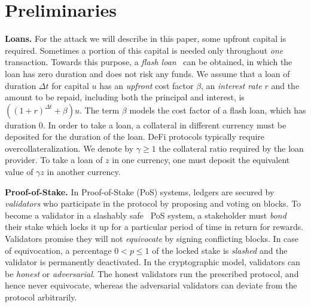 \section{Preliminaries}\label{sec:preliminaries}


\noindent
\textbf{Loans.} For the attack we will describe in this paper, some upfront
capital is required. Sometimes a portion of this capital is needed only throughout \emph{one}
transaction. Towards this purpose, a \emph{flash loan}~\cite{gudgeon2020defi} can
be obtained, in which the loan has zero duration and does not risk any funds. We assume that
a loan of duration $\Delta t$ for capital $u$ has an \emph{upfront} cost factor $\beta$,
an \emph{interest rate} $r$ and the amount to be repaid, including both the principal and interest, is
$((1 + r)^{\Delta t} + \beta) u$. The term $\beta$ models the cost factor of a flash loan,
which has duration $0$.
In order to take a loan, a collateral in different currency must be deposited for the duration
of the loan. DeFi protocols typically require overcollateralization. We denote by
$\gamma \geq 1$ the collateral ratio required by the loan provider.
To take a loan of $z$ in one currency, one must deposit the equivalent
value of $\gamma z$ in another currency.

\noindent
\textbf{Proof-of-Stake.} In Proof-of-Stake (PoS) systems, ledgers are secured
by \emph{validators} who participate in the protocol by proposing and voting
on blocks. To become a validator in a slashably safe~\cite{slashable-safety} PoS
system, a stakeholder must \emph{bond} their stake
which locks it up for a particular period of time in return for rewards.
Validators promise they will
not \emph{equivocate} by signing conflicting blocks.
In case of equivocation, a percentage $0 < p \leq 1$ of the locked stake is
\emph{slashed} and the validator is permanently deactivated. In the cryptographic
model, validators can be \emph{honest} or \emph{adversarial}. The honest validators
run the prescribed protocol, and hence never equivocate, whereas the adversarial
validators can deviate from the protocol arbitrarily.

